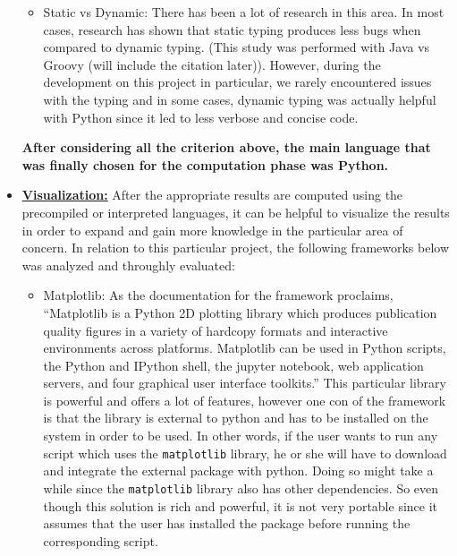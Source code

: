 \begin{itemize}
\begin{itemize}
        \item Static vs Dynamic: There has been a lot of research in this area. In most cases, research has shown that static typing produces less bugs when compared to dynamic typing. (This study was performed with Java vs Groovy (will include the citation later)). However, during the development on this project in particular, we rarely encountered issues with the typing and in some cases, dynamic typing was actually helpful with Python since it led to less verbose and concise code.  
    \end{itemize}
    
    \textbf{After considering all the criterion above, the main language that was finally chosen for the computation phase was Python.}
    
    \item \textbf{\underline{Visualization:}} After the appropriate results are computed using the precompiled or interpreted languages, it can be helpful to visualize the results in order to expand and gain more knowledge in the particular area of concern. In relation to this particular project, the following frameworks below was analyzed and throughly evaluated:
    
    
    \begin{itemize}
        \item Matplotlib: As the documentation for the framework proclaims, ``Matplotlib is a Python 2D plotting library which produces publication quality figures in a variety of hardcopy formats and interactive environments across platforms. Matplotlib can be used in Python scripts, the Python and IPython shell, the jupyter notebook, web application servers, and four graphical user interface toolkits.'' This particular library is powerful and offers a lot of features, however one con of the framework is that the library is external to python and has to be installed on the system in order to be used. In other words, if the user wants to run any script which uses the \verb|matplotlib| library, he or she will have to download and integrate the external package with python. Doing so might take a while since the \verb|matplotlib| library also has other dependencies. So even though this solution is rich and powerful, it is not very portable since it assumes that the user has installed the package before running the corresponding script.\newline
        

\end{itemize}
\end{itemize}
